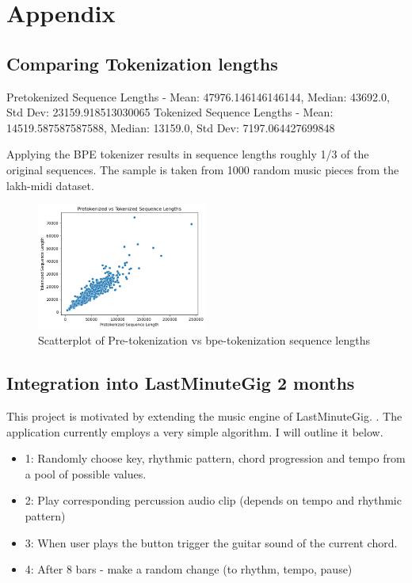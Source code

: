 
\chapter{Appendix}
\section{Comparing Tokenization lengths}
\label{tok_compare}
Pretokenized Sequence Lengths - Mean: 47976.146146146144, Median: 43692.0, Std Dev: 23159.918513030065
Tokenized Sequence Lengths - Mean: 14519.587587587588, Median: 13159.0, Std Dev: 7197.064427699848

Applying the BPE tokenizer results in sequence lengths roughly 1/3 of the original sequences. The sample is taken from 1000 random music pieces from the lakh-midi dataset. 

\begin{figure}[H]
    \centering
    \includegraphics[width=0.5\textwidth]{IMAGES/scatter_pre_post_tok.png} 
    \caption{Scatterplot of Pre-tokenization vs bpe-tokenization sequence lengths}
    \label{fig:tok_compare}
\end{figure}


\section{Integration into LastMinuteGig 2 months}
This project is motivated by extending the music engine of LastMinuteGig. \cite{Chalkiadakis_2022}. The application currently employs a very simple algorithm. I will outline it below. 
\begin{itemize}
    \item{1}: Randomly choose key, rhythmic pattern, chord progression and tempo from a pool of possible values.
    \item{2}: Play corresponding percussion audio clip (depends on tempo and rhythmic pattern)
    \item{3}: When user plays the button trigger the guitar sound of the current chord.
    \item{4}: After 8 bars - make a random change (to rhythm, tempo, pause)
\end{itemize}


